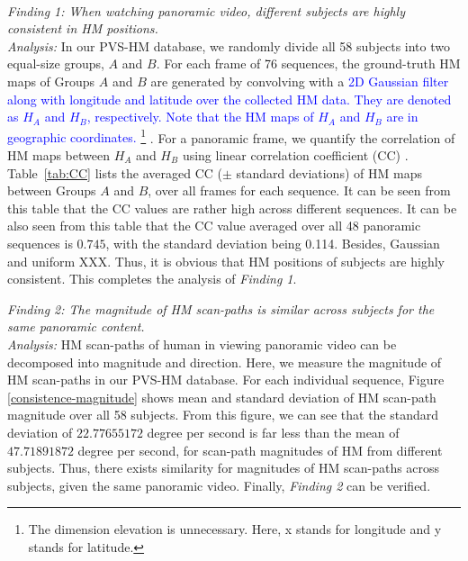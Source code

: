 \documentclass[10pt,journal,compsoc]{IEEEtran}
\begin{document}
\emph{\\Finding 1: When watching panoramic video, different subjects are highly consistent in HM positions.}
\\ \textit{Analysis:} In our PVS-HM database, we randomly divide all 58 subjects into two equal-size groups, $A$ and $B$.
For each frame of 76 sequences, the ground-truth HM maps of Groups $A$ and $B$ are generated by convolving with a \textcolor{blue}{ 2D Gaussian filter along with longitude and latitude over the collected HM data.
They are denoted as $H_A$ and $H_B$, respectively.
Note that the HM maps of $H_A$ and $H_B$ are in geographic coordinates.
\footnote{The dimension elevation is unnecessary. Here, x stands for longitude and y stands for latitude.}} \cite{Goodchild2007}.
For a panoramic frame, we quantify the correlation of HM maps between $H_A$ and $H_B$ using linear correlation coefficient (CC) \cite{li2015data}.
Table~\ref{tab:CC} lists the averaged CC ($\pm$ standard deviations) of HM maps between Groups $A$ and $B$, over all frames for each sequence.
It can be seen from this table that the CC values are rather high across different sequences.
It can be also seen from this table that the CC value averaged over all 48 panoramic sequences is $0.745$, with the standard deviation being 0.114.
Besides, Gaussian and uniform XXX.
Thus, it is obvious that HM positions of subjects are highly consistent.
This completes the analysis of \textit{Finding 1}.

\emph{Finding 2: The magnitude of HM scan-paths is similar across subjects for the same panoramic content.}
\\ \textit{Analysis:} HM scan-paths of human in viewing panoramic video can be decomposed into magnitude and direction.
 Here, we measure the magnitude of HM scan-paths in our PVS-HM database.
 For each individual sequence, Figure \ref{consistence-magnitude} shows mean and standard deviation of HM scan-path magnitude over all 58 subjects.
 From this figure, we can see that the standard deviation of $22.77655172$ degree per second is far less than the mean of $47.71891872$ degree per second, for scan-path magnitudes of HM from different subjects.
 Thus, there exists similarity for magnitudes of HM scan-paths across subjects, given the same panoramic video.
 Finally, \emph{Finding 2} can be verified.
\end{document}
